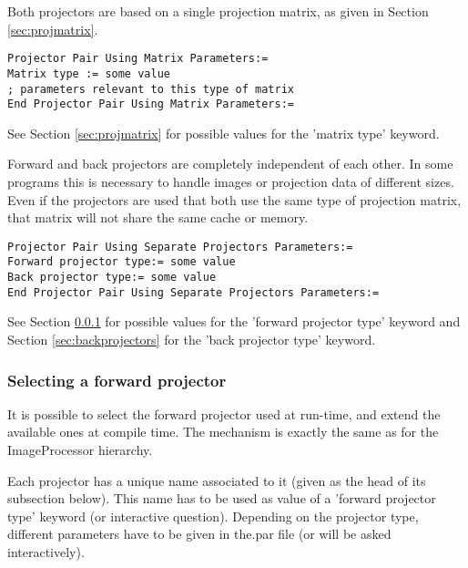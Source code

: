 \documentclass{article}
\begin{document}
{ 
}
\label{sec:projectorpairusingmatrix}
Both projectors are based on a single projection matrix, as given 
in Section \ref{sec:projmatrix}.

{ 
}
\begin{verbatim}
Projector Pair Using Matrix Parameters:=
Matrix type := some value
; parameters relevant to this type of matrix
End Projector Pair Using Matrix Parameters:=
\end{verbatim}

See Section \ref{sec:projmatrix} for possible values for the 'matrix type' keyword.

{ 
}

Forward and back projectors are completely independent of each 
other. In some programs this is necessary to handle images or 
projection data of different sizes. \\
Even if the projectors are used that both use the same type of 
projection matrix, that matrix will not share the same cache 
or memory.

{ 
}
\begin{verbatim}
Projector Pair Using Separate Projectors Parameters:=
Forward projector type:= some value
Back projector type:= some value
End Projector Pair Using Separate Projectors Parameters:=
\end{verbatim}


See Section \ref{sec:forwardprojectors} for possible values for the 'forward projector 
type' keyword and Section \ref{sec:backprojectors} for the 'back projector type' 
keyword.


\subsubsection{
Selecting a forward projector}
\label{sec:forwardprojectors}
It is possible to select the forward projector used at run-time, 
and extend the available ones at compile time. The mechanism 
is exactly the same as for the ImageProcessor hierarchy.


Each projector has a unique name associated to it (given as the 
head of its subsection below). This name has to be used as value 
of a 'forward projector type' keyword (or interactive question). 
Depending on the projector type, different parameters have to 
be given in the.par file (or will be asked interactively).

{ 
}
\end{document}
